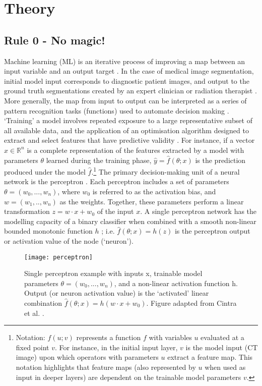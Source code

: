 \chapter{Theory}
\label{ch:theory}

\section{Rule 0 - No magic!}
\label{NoMagic}
Machine learning (ML) is an iterative process of improving a map between an input variable and an output target \cite{Maier2019}. In the case of medical image segmentation, initial model input corresponds to diagnostic patient images, and output to the ground truth segmentations created by an expert clinician or radiation therapist \cite{Kazemifar_2018}. More generally, the map from input to output can be interpreted as a series of pattern recognition tasks (functions) used to automate decision making \cite{Maier2019}. `Training' a model involves repeated exposure to a large representative subset of all available data, and the application of an optimisation algorithm designed to extract and select features that have predictive validity \cite{Maier2019}. For instance, if a vector $x\in\mathbb{R}^{n}$ is a complete representation of the features extracted by a model with parameters $\theta$ learned during the training phase, $\hat{y} = \hat{f}(\theta; x)$ is the prediction produced under the model $\hat{f}$.\footnote{Notation: $f(u; v)$ represents a function $f$ with variables $u$ evaluated at a fixed point $v$. For instance, in the initial input layer, $v$ is the model input (CT image) upon which operators with parameters $u$ extract a feature map. This notation highlights that feature maps (also represented by $u$ when used as input in deeper layers) are dependent on the trainable model parameters $v$.} The primary decision-making unit of a neural network is the perceptron \cite{Maier2019}. Each perceptron includes a set of parameters $\theta = (w_{0}, ...,w_{n} )$, where $w_{0}$ is referred to as the activation bias, and $w = (w_{1},..,w_{n})$ as the weights. Together, these parameters perform a linear transformation $z = w \cdot x + w_{0}$ of the input $x$. A single perceptron network has the modelling capacity of a binary classifier when combined with a smooth non-linear bounded monotonic function $h$ \cite{Maier2019}; i.e. $\hat{f}(\theta; x) = h(z)$ is the perceptron output or activation value of the node (`neuron'). 


\begin{figure}[H]
	\begin{center}
		\texttt{[image: perceptron]}
		\caption{Single perceptron example with inputs x, trainable model parameters $\theta = (w_{0}, ...,w_{n} )$, and a non-linear activation function h. Output (or neuron activation value) is the `activated' linear combination $\hat{f}(\theta; x) = h(w \cdot x + w_{0})$. Figure adapted from Cintra et al. \cite{cintra2018}.}
		\label{fig:percept}
	\end{center}
\end{figure}
 

